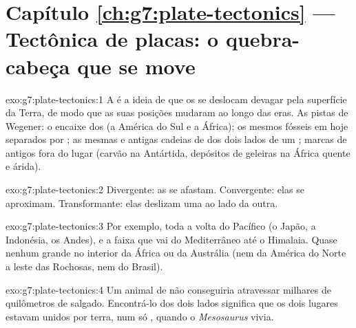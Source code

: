 \section*{Capítulo \ref{ch:g7:plate-tectonics} --- Tectônica de placas: o quebra-cabeça que se move}

\begin{solution}{exo:g7:plate-tectonics:1}
A  é a ideia de que os  se deslocam devagar
pela superfície da Terra, de modo que as suas posições mudaram ao longo das
eras. As pistas de Wegener: o encaixe dos  (a América do Sul e a
África); os mesmos fósseis em  hoje separados por ; as
mesmas  e antigas cadeias de  dos dois lados de um ;
marcas de  antigos fora do lugar (carvão na Antártida, depósitos de
geleiras na África quente e árida).
\end{solution}

\begin{solution}{exo:g7:plate-tectonics:2}
Divergente: as  se afastam. Convergente: elas se aproximam.
Transformante: elas deslizam uma ao lado da outra.
\end{solution}

\begin{solution}{exo:g7:plate-tectonics:3}
Por exemplo, toda a volta do  Pacífico (o Japão, a Indonésia, os
Andes), e a faixa que vai do Mediterrâneo até o Himalaia. Quase nenhum
grande  no interior da África ou da Austrália (nem da América do
Norte a leste das  Rochosas, nem do Brasil).
\end{solution}

\begin{solution}{exo:g7:plate-tectonics:4}
Um animal de  não conseguiria atravessar milhares de quilômetros
de  salgado. Encontrá-lo dos dois lados significa que os dois lugares
estavam unidos por terra, num só , quando o \emph{Mesosaurus}
vivia.
\end{solution}

